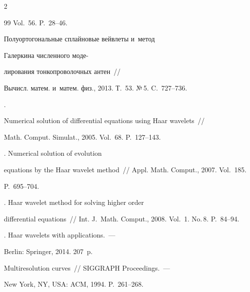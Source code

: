 \begin{multicols}{2}
{{\begin{thebibliography}{99}
Vol.~56. P.~28--46.




 Полуортогональные сплайновые вейвлеты и~метод 


Галеркина численного моде-\linebreak\vspace*{-11pt}





\pagebreak





\noindent


лирования тонкопроволочных антен~// 


Вычисл. матем. и~матем. физ., 2013. Т.~53. №\,5. C.~727--736.







. 


Numerical solution of differential equations using Haar wavelets~//  


Math. Comput. Simulat., 2005. Vol.~68. P.~127--143.




. Numerical solution of evolution 


equations by the Haar wavelet method~//  Appl. Math. Comput., 2007.  Vol.~185. 


P.~695--704.




. Haar wavelet method for solving higher order


 differential equations~// Int. J.~Math. Comput., 2008. Vol.~1. No.\,8. P.~84--94.







.  Haar wavelets with applications.~---  


Berlin: Springer, 2014. 207~p.




 Multiresolution curves~// SIGGRAPH Proceedings.~--- 


New York, NY, USA: ACM, 1994. P.~261--268.





\end{thebibliography}}}
\end{multicols}
